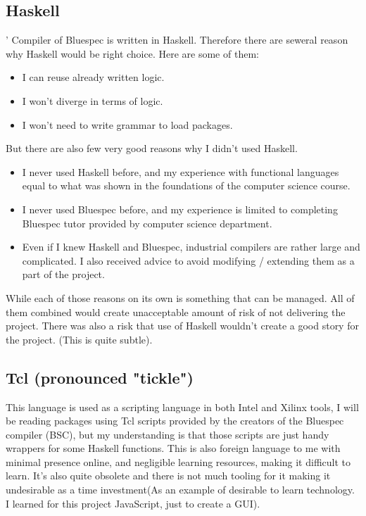 \documentclass[14pt]{report}
\begin{document}
\subsection{Haskell}'
Compiler of Bluespec is written in Haskell. Therefore there are seweral reason why Haskell would be right choice. Here are some of them:
\begin{itemize}
    \item I can reuse already written logic.
    \item I won't diverge in terms of logic.
    \item I won't need to write grammar to load packages.
\end{itemize}
But there are also few very good reasons why I didn't used Haskell.
\begin{itemize}
    \item I never used Haskell before, and my experience with functional languages equal to what was shown in the foundations of the computer science course.
    \item I never used Bluespec before, and my experience is limited to completing Bluespec tutor provided by computer science department.
    \item Even if I knew Haskell and Bluespec, industrial compilers are rather large and complicated. I also received advice to avoid modifying / extending them as a part of the project.
\end{itemize}
While each of those reasons on its own is something that can be managed. All of them combined would create unacceptable amount of risk of not delivering the project. There was also a risk that use of Haskell wouldn't create a good story for the project. (This is quite subtle).

\subsection{Tcl (pronounced "tickle")}
This language is used as a scripting language in both Intel and Xilinx tools, I will be reading packages using Tcl scripts provided by the creators of the Bluespec compiler (BSC), but my understanding is that those scripts are just handy wrappers for some Haskell functions. This is also foreign language to me with minimal presence online, and negligible learning resources, making it difficult to learn. It's also quite obsolete and there is not much tooling for it making it undesirable as a time investment(As an example of desirable to learn technology. I learned for this project JavaScript, just to create a GUI).
\end{document}

